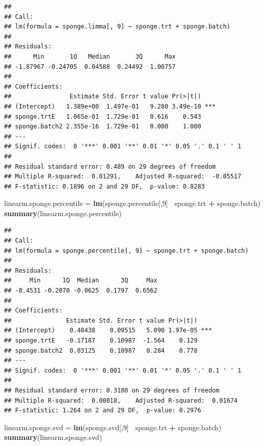 \documentclass[]{book}
\newenvironment{Shaded}{\begin{snugshade}}{\end{snugshade}}
\newcommand{\KeywordTok}[1]{\textcolor[rgb]{0.13,0.29,0.53}{\textbf{#1}}}
\newcommand{\DecValTok}[1]{\textcolor[rgb]{0.00,0.00,0.81}{#1}}
\newcommand{\StringTok}[1]{\textcolor[rgb]{0.31,0.60,0.02}{#1}}
\newcommand{\OperatorTok}[1]{\textcolor[rgb]{0.81,0.36,0.00}{\textbf{#1}}}
\newcommand{\NormalTok}[1]{#1}
\begin{document}
\begin{verbatim}
## 
## Call:
## lm(formula = sponge.limma[, 9] ~ sponge.trt + sponge.batch)
## 
## Residuals:
##      Min       1Q   Median       3Q      Max 
## -1.87967 -0.24705  0.04588  0.24492  1.00757 
## 
## Coefficients:
##                Estimate Std. Error t value Pr(>|t|)    
## (Intercept)   1.389e+00  1.497e-01   9.280 3.49e-10 ***
## sponge.trtE   1.065e-01  1.729e-01   0.616    0.543    
## sponge.batch2 2.355e-16  1.729e-01   0.000    1.000    
## ---
## Signif. codes:  0 '***' 0.001 '**' 0.01 '*' 0.05 '.' 0.1 ' ' 1
## 
## Residual standard error: 0.489 on 29 degrees of freedom
## Multiple R-squared:  0.01291,    Adjusted R-squared:  -0.05517 
## F-statistic: 0.1896 on 2 and 29 DF,  p-value: 0.8283
\end{verbatim}

\begin{Shaded}
\begin{Highlighting}[]
\NormalTok{linearm.sponge.percentile =}\StringTok{ }\KeywordTok{lm}\NormalTok{(sponge.percentile[,}\DecValTok{9}\NormalTok{]}\OperatorTok{~}\StringTok{ }\NormalTok{sponge.trt }\OperatorTok{+}\StringTok{ }\NormalTok{sponge.batch)}
\KeywordTok{summary}\NormalTok{(linearm.sponge.percentile)}
\end{Highlighting}
\end{Shaded}

\begin{verbatim}
## 
## Call:
## lm(formula = sponge.percentile[, 9] ~ sponge.trt + sponge.batch)
## 
## Residuals:
##     Min      1Q  Median      3Q     Max 
## -0.4531 -0.2070 -0.0625  0.1797  0.6562 
## 
## Coefficients:
##               Estimate Std. Error t value Pr(>|t|)    
## (Intercept)    0.48438    0.09515   5.090 1.97e-05 ***
## sponge.trtE   -0.17187    0.10987  -1.564    0.129    
## sponge.batch2  0.03125    0.10987   0.284    0.778    
## ---
## Signif. codes:  0 '***' 0.001 '**' 0.01 '*' 0.05 '.' 0.1 ' ' 1
## 
## Residual standard error: 0.3108 on 29 degrees of freedom
## Multiple R-squared:  0.08018,    Adjusted R-squared:  0.01674 
## F-statistic: 1.264 on 2 and 29 DF,  p-value: 0.2976
\end{verbatim}

\begin{Shaded}
\begin{Highlighting}[]
\NormalTok{linearm.sponge.svd =}\StringTok{ }\KeywordTok{lm}\NormalTok{(sponge.svd[,}\DecValTok{9}\NormalTok{]}\OperatorTok{~}\StringTok{ }\NormalTok{sponge.trt }\OperatorTok{+}\StringTok{ }\NormalTok{sponge.batch)}
\KeywordTok{summary}\NormalTok{(linearm.sponge.svd)}
\end{Highlighting}
\end{Shaded}
\end{document}
